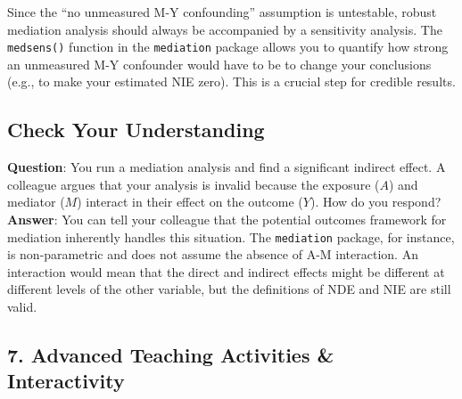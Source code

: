 \documentclass[
  10pt,
  letterpaper,
  DIV=11,
  numbers=noendperiod,
  oneside]{scrartcl}
\begin{document}
\begin{tcolorbox}[enhanced jigsaw, colbacktitle=quarto-callout-important-color!10!white, arc=.35mm, opacitybacktitle=0.6, bottomrule=.15mm, colback=white, rightrule=.15mm, bottomtitle=1mm, colframe=quarto-callout-important-color-frame, toptitle=1mm, titlerule=0mm, coltitle=black, title=\textcolor{quarto-callout-important-color}{\faExclamation}\hspace{0.5em}{Key Assumption Check: Sensitivity Analysis}, toprule=.15mm, leftrule=.75mm, breakable, left=2mm, opacityback=0]

Since the ``no unmeasured M-Y confounding'' assumption is untestable,
robust mediation analysis should always be accompanied by a sensitivity
analysis. The \texttt{medsens()} function in the \texttt{mediation}
package allows you to quantify how strong an unmeasured M-Y confounder
would have to be to change your conclusions (e.g., to make your
estimated NIE zero). This is a crucial step for credible results.

\end{tcolorbox}

\subsection{Check Your Understanding}\label{check-your-understanding}

\textbf{Question}: You run a mediation analysis and find a significant
indirect effect. A colleague argues that your analysis is invalid
because the exposure (\(A\)) and mediator (\(M\)) interact in their
effect on the outcome (\(Y\)). How do you respond? \textbf{Answer}: You
can tell your colleague that the potential outcomes framework for
mediation inherently handles this situation. The \texttt{mediation}
package, for instance, is non-parametric and does not assume the absence
of A-M interaction. An interaction would mean that the direct and
indirect effects might be different at different levels of the other
variable, but the definitions of NDE and NIE are still valid.

\subsection{7. Advanced Teaching Activities \&
Interactivity}\label{advanced-teaching-activities-interactivity}
\end{document}
